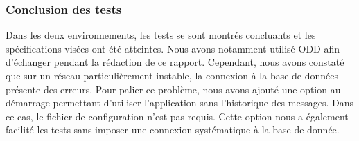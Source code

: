 \documentclass[12pt, a4paper]{article}
\begin{document}
    
    \subsubsection{Conclusion des tests}
    Dans les deux environnements, les tests se sont montrés concluants et les spécifications visées ont été atteintes. Nous avons notamment utilisé ODD afin d'échanger pendant la rédaction de ce rapport. Cependant, nous avons constaté que sur un réseau particulièrement instable, la connexion à la base de données présente des erreurs. Pour palier ce problème, nous avons ajouté une option au démarrage permettant d'utiliser l'application sans l'historique des messages. Dans ce cas, le fichier de configuration n'est pas requis. Cette option nous a également facilité les tests sans imposer une connexion systématique à la base de donnée. 
    
\end{document}
